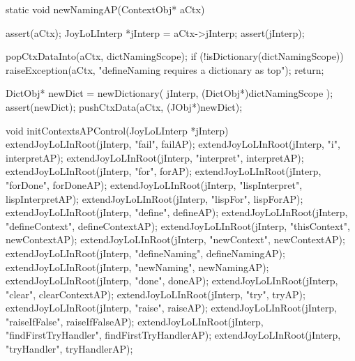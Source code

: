 \startCCode
static void newNamingAP(ContextObj* aCtx) {
  assert(aCtx);
  JoyLoLInterp *jInterp = aCtx->jInterp;
  assert(jInterp);

  popCtxDataInto(aCtx, dictNamingScope);
  if (!isDictionary(dictNamingScope)) {
    raiseException(aCtx,
      "defineNaming requires a dictionary as top");
    return;
  }

  DictObj* newDict =
    newDictionary(
      jInterp,
      (DictObj*)dictNamingScope
    );
  assert(newDict);
  pushCtxData(aCtx, (JObj*)newDict);
}
\stopCCode

\startCCode
void initContextsAPControl(JoyLoLInterp *jInterp) {
  extendJoyLoLInRoot(jInterp, "fail",                failAP);
  extendJoyLoLInRoot(jInterp, "i",                   interpretAP);
  extendJoyLoLInRoot(jInterp, "interpret",           interpretAP);
  extendJoyLoLInRoot(jInterp, "for",                 forAP);
  extendJoyLoLInRoot(jInterp, "forDone",             forDoneAP);
  extendJoyLoLInRoot(jInterp, "lispInterpret",       lispInterpretAP);
  extendJoyLoLInRoot(jInterp, "lispFor",             lispForAP);
  extendJoyLoLInRoot(jInterp, "define",              defineAP);
  extendJoyLoLInRoot(jInterp, "defineContext",       defineContextAP);
  extendJoyLoLInRoot(jInterp, "thisContext",         newContextAP);
  extendJoyLoLInRoot(jInterp, "newContext",          newContextAP);
  extendJoyLoLInRoot(jInterp, "defineNaming",        defineNamingAP);
  extendJoyLoLInRoot(jInterp, "newNaming",           newNamingAP);
  extendJoyLoLInRoot(jInterp, "done",                doneAP);
  extendJoyLoLInRoot(jInterp, "clear",               clearContextAP);
  extendJoyLoLInRoot(jInterp, "try",                 tryAP);
  extendJoyLoLInRoot(jInterp, "raise",               raiseAP);
  extendJoyLoLInRoot(jInterp, "raiseIfFalse",        raiseIfFalseAP);
  extendJoyLoLInRoot(jInterp, "findFirstTryHandler", findFirstTryHandlerAP);
  extendJoyLoLInRoot(jInterp, "tryHandler",          tryHandlerAP);
}
\stopCCode